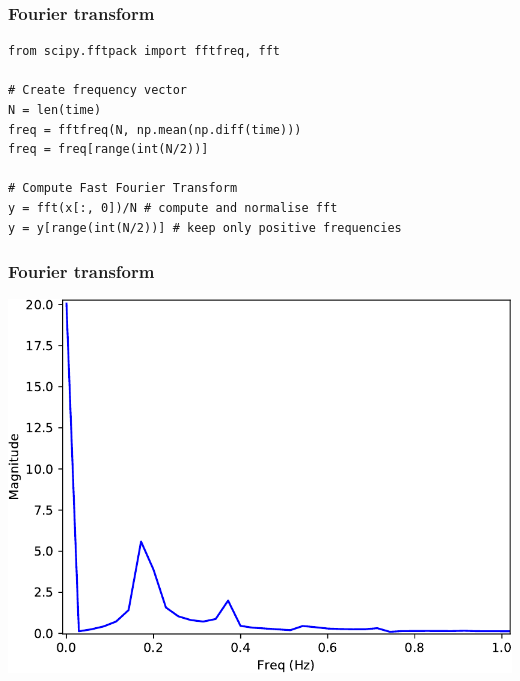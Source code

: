 \documentclass[pdf]{beamer}
\begin{document}
\begin{frame}[fragile]
\frametitle{Fourier transform}

\begin{lstlisting}[style=python]
from scipy.fftpack import fftfreq, fft

# Create frequency vector
N = len(time)
freq = fftfreq(N, np.mean(np.diff(time)))
freq = freq[range(int(N/2))]

# Compute Fast Fourier Transform
y = fft(x[:, 0])/N # compute and normalise fft
y = y[range(int(N/2))] # keep only positive frequencies
\end{lstlisting}

\end{frame}

\begin{frame}[fragile]
\frametitle{Fourier transform}

\begin{center}
	\includegraphics[width=.8\textwidth]{fourier.pdf}
\end{center}

\end{frame}

\end{document}
